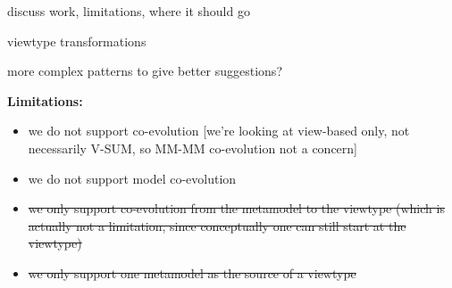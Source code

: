discuss work, limitations, where it should go

viewtype transformations

more complex patterns to give better suggestions?

\textbf{Limitations:}
\begin{itemize}
    \item we do not support \metamodel \metamodel co-evolution [we’re looking at view-based only, not necessarily V-SUM, so MM-MM co-evolution not a concern]
    \item we do not support \metamodel model co-evolution
    \item \st{we only support co-evolution from the metamodel to the viewtype (which is actually not a limitation, since conceptually one can still start at the viewtype)}
    \item \st{we only support one metamodel as the source of a viewtype}
\end{itemize}